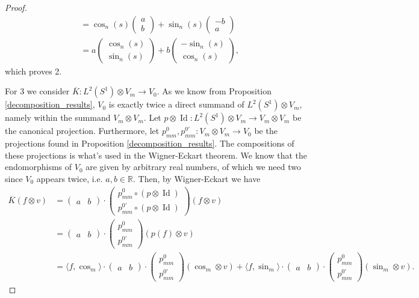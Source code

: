 \documentclass[12pt, a4paper]{article}
\theoremstyle{plain}
\theoremstyle{definition}
\theoremstyle{remark}
\newcommand{\R}{\mathds{R}}
\DeclareMathOperator{\Id}{Id}
\begin{document}
\begin{proof}
\begin{align*}
& = \cos_n(s)  \begin{pmatrix} a \\ b\end{pmatrix} + \sin_n(s) \begin{pmatrix} -b \\ a \end{pmatrix} \\
& = a \begin{pmatrix} \cos_n(s) \\ \sin_n(s)\end{pmatrix} + b \begin{pmatrix} - \sin_n(s) \\ \cos_n(s) \end{pmatrix},
\end{align*}
which proves 2.

For $3$ we consider $\overline{K}: L^2(S^1) \otimes V_m \to V_0$. As we know from Proposition \ref{decomposition_results}, $V_0$ is exactly twice a direct summand of $L^2(S^1) \otimes V_m$, namely within the summand $V_m \otimes V_m$. Let $p \otimes \Id : L^2(S^1) \otimes V_m \to V_m \otimes V_m$ be the canonical projection. Furthermore, let $p_{mm}^{0}, p_{mm}^{0'}: V_m \otimes V_m \to V_0$ be the projections found in Proposition \ref{decomposition_results}. The compositions of these projections is what's used in the Wigner-Eckart theorem. We know that the endomorphisms of $V_0$ are given by arbitrary real numbers, of which we need two since $V_0$ appears twice, i.e. $a, b \in \R$. Then, by Wigner-Eckart we have 
\begin{align*}
\overline{K}(f \otimes v) &= \begin{pmatrix}a & b \end{pmatrix} \cdot \begin{pmatrix}p_{mm}^{0}\circ \left( p \otimes \Id\right) \\  p_{mm}^{0'}\circ \left( p \otimes \Id\right) \end{pmatrix} (f \otimes v) \\
& = \begin{pmatrix}a & b \end{pmatrix} \cdot \begin{pmatrix}p_{mm}^{0}  \\  p_{mm}^{0'} \end{pmatrix} (p(f) \otimes v) \\
& = \langle f, \cos_m \rangle \cdot \begin{pmatrix}a & b \end{pmatrix} \cdot \begin{pmatrix}p_{mm}^{0}  \\  p_{mm}^{0'} \end{pmatrix} (\cos_m \otimes v) + \langle f, \sin_m\rangle \cdot \begin{pmatrix}a & b \end{pmatrix} \cdot \begin{pmatrix}p_{mm}^{0}  \\  p_{mm}^{0'} \end{pmatrix} (\sin_m \otimes v).

\end{align*}
\end{proof}
\end{document}
